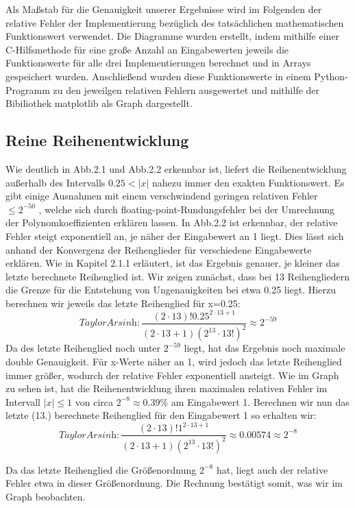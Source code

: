 \documentclass[course=erap] {aspdoc}
\begin{document}
    Als Maßstab für die Genauigkeit unserer Ergebnisse wird im Folgenden der relative Fehler der Implementierung bezüglich des tatsächlichen mathematischen Funktionswert verwendet. Die Diagramme wurden erstellt, indem mithilfe einer C-Hilfsmethode für eine große Anzahl an Eingabewerten jeweils die Funktionswerte für alle drei Implementierungen berechnet und in Arrays gespeichert wurden. Anschließend wurden diese Funktionswerte in einem Python-Programm zu den jeweilgen relativen Fehlern ausgewertet und mithilfe der Bibiliothek matplotlib als Graph dargestellt.
    
    \subsection{Reine Reihenentwicklung}
    Wie deutlich in Abb.2.1 und Abb.2.2 erkennbar ist, liefert die Reihenentwicklung außerhalb des Intervalls $0.25<|x|$ nahezu immer den exakten Funktionswert. Es gibt einige Ausnahmen mit einem verschwindend geringen relativen Fehler $\leq2^{-50}$ , welche sich durch floating-point-Rundungsfehler bei der Umrechnung der Polynomkoeffizienten erklären lassen.
    In Abb.2.2 ist erkennbar, der relative Fehler steigt exponentiell an, je näher der Eingabewert an 1 liegt. Dies lässt sich anhand der Konvergenz der Reihenglieder für verschiedene Eingabewerte erklären. Wie in Kapitel 2.1.1 erläutert, ist das Ergebnis genauer, je kleiner das letzte berechnete Reihenglied ist.
    Wir zeigen zunächst, dass bei 13 Reihengliedern die Grenze für die Entstehung von Ungenauigkeiten bei etwa 0.25 liegt. Hierzu berechnen wir jeweils das letzte Reihenglied für x=0.25:
    \[
    \textit{TaylorArsinh}: \frac{(2\cdot13)!0.25^{2\cdot13 + 1}}{(2\cdot13 + 1)(2^13\cdot13!)^2} \approx 2^{-59}
    \]
    Da des letzte Reihenglied noch unter $2^{-59}$ liegt, hat das Ergebnis noch maximale double Genauigkeit. Für x-Werte näher an 1, wird jedoch das letzte Reihenglied immer größer, wodurch der relative Fehler exponentiell ansteigt. Wie im Graph zu sehen ist, hat die Reihenentwicklung ihren maximalen relativen Fehler im Intervall $|x|\leq1$ von circa $2^{-8} \approx 0.39\%$ am Eingabewert 1.
    Berechnen wir nun das letzte (13.) berechnete Reihenglied für den Eingabewert 1 so erhalten wir:
    \[
    \textit{TaylorArsinh}: \frac{(2\cdot13)!1^{2\cdot13 + 1}}{(2\cdot13 + 1)(2^13\cdot13!)^2} \approx 0.00574 \approx 2^{-8}
    \]

    Da das letzte Reihenglied die Größenordnung $2^{-8}$ hat, liegt auch der relative Fehler etwa in dieser Größenordnung. Die Rechnung bestätigt somit, was wir im Graph beobachten.
\end{document}
